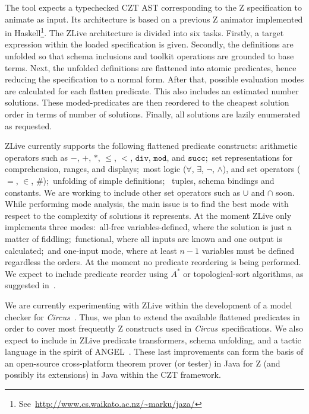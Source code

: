 \documentclass{llncs}
\newcommand{\Circus}{{\sf\slshape Circus}}
\begin{document}
    The tool expects a typechecked CZT AST corresponding to the Z
    specification to animate as input. Its architecture is based on a
    previous Z animator implemented in
    Haskell\footnote{See~\url{http://www.cs.waikato.ac.nz/~marku/jaza/}}.
    The ZLive architecture is divided into six tasks.  Firstly, a
    target expression within the loaded specification is given.
    Secondly, the definitions are unfolded so that schema inclusions
    and toolkit operations are grounded to base terms. Next, the
    unfolded definitions are flattened into atomic predicates, hence
    reducing the specification to a normal form.  After that, possible
    evaluation modes are calculated for each flatten predicate.  This
    also includes an estimated number solutions.  These
    moded-predicates are then reordered to the cheapest solution order
    in terms of number of solutions. Finally, all solutions are lazily
    enumerated as requested.

    ZLive currently supports the following flattened predicate
    constructs: arithmetic operators such as $-$, $+$, $*$, $\leq$,
    $<$, $\mathtt{div}$, $\mathtt{mod}$, and $\mathtt{succ}$;~set
    representations for comprehension, ranges, and displays;~most
    logic ($\forall$, $\exists$, $\lnot$, $\land$), and set operators
    ($=$, $\in$, $\#$);~unfolding of simple definitions; ~tuples,
    schema bindings and constants.  We are working to include other
    set operators such as $\cup$ and $\cap$ soon.  While performing
    mode analysis, the main issue is to find the best mode with
    respect to the complexity of solutions it represents. At the
    moment ZLive only implements three modes:~all-free
    variables-defined, where the solution is just a matter of
    fiddling;~functional, where all inputs are known and one output is
    calculated;~and one-input mode, where at least $n-1$ variables
    must be defined regardless the orders. At the moment no predicate
    reordering is being performed.  We expect to include predicate
    reorder using $A^*$ or topological-sort algorithms, as suggested
    in~\cite{winikooff98}.

    We are currently experimenting with ZLive within the development
    of a model checker for \Circus~\cite{circus.mc:leo}.  Thus, we
    plan to extend the available flattened predicates in order to
    cover most frequently Z constructs used in \Circus\
    specifications.  We also expect to include in ZLive predicate
    transformers, schema unfolding, and a tactic language in the
    spirit of ANGEL~\cite{z.others:angel}.  These last improvements
    can form the basis of an open-source cross-platform theorem prover
    (or tester) in Java for Z (and possibly its extensions) in Java
    within the CZT framework.
\end{document}
